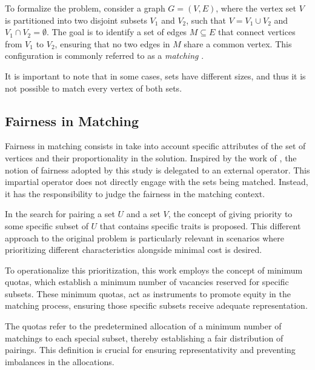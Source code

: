            To formalize the problem, consider a graph \( G = (V, E) \), where the vertex set \( V \) is partitioned into two disjoint subsets \( V_1 \) and \( V_2 \), such that \( V = V_1 \cup V_2 \) and \( V_1 \cap V_2 = \emptyset \). The goal is to identify a set of edges \( M \subseteq E \) that connect vertices from \( V_1 \) to \( V_2 \), ensuring that no two edges in \( M \) share a common vertex. This configuration is commonly referred to as a \textit{matching} \cite{hopcroft1973n}.
            
            It is important to note that in some cases, sets have different sizes, and thus it is not possible to match every vertex of both sets.
            
        \subsection{Fairness in Matching}
            
            Fairness in matching consists in take into account specific attributes of the set of vertices and their proportionality in the solution.
            Inspired by the work of \cite{sankar}, the notion of fairness adopted by this study is delegated to an external operator. This impartial operator does not directly engage with the sets being matched. Instead, it has the responsibility to judge the fairness in the matching context.
            
            In the search for pairing a set $U$ and a set $V$, the concept of giving priority to some specific subset of $U$ that contains specific traits is proposed. This different approach to the original problem is particularly relevant in scenarios where prioritizing different characteristics alongside minimal cost is desired.
            
            To operationalize this prioritization, this work employs the concept of minimum quotas, which establish a minimum number of vacancies reserved for specific subsets. 
            These minimum quotas, act as instruments to promote equity in the matching process, ensuring those specific subsets receive adequate representation.
            
            The quotas refer to the predetermined allocation of a minimum number of matchings to each special subset, thereby establishing a fair distribution of pairings. This definition is crucial for ensuring representativity and preventing imbalances in the allocations.
            
